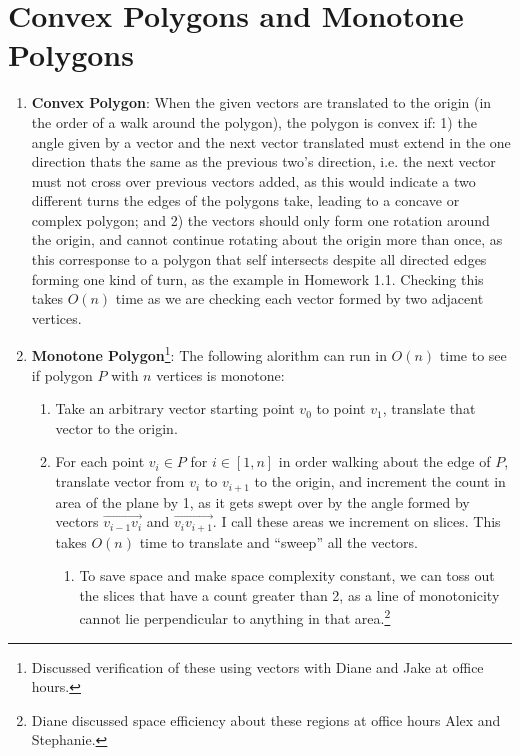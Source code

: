 \documentclass [12pt]{article}
\begin{document}
    \section{Convex Polygons and Monotone Polygons}
    \label{sec:three}

        \begin{enumerate}[label=\alph*.]
            \item \textbf{Convex Polygon}\footnotemark[2]: When the given vectors are translated to the origin (in the order of a walk around the polygon), the polygon is convex if: 1) the angle given by a vector and the next vector translated must extend in the one direction thats the same as the previous two's direction, i.e. the next vector must not cross over previous vectors added, as this would indicate a two different turns the edges of the polygons take, leading to a concave or complex polygon; and 2) the vectors should only form one rotation around the origin, and cannot continue rotating about the origin more than once, as this corresponse to a polygon that self intersects despite all directed edges forming one kind of turn, as the example in Homework 1.1. Checking this takes $O(n)$ time as we are checking each vector formed by two adjacent vertices.
            
            \item \textbf{Monotone Polygon}\footnote{Discussed verification of these using vectors with Diane and Jake at office hours.}: The following alorithm can run in $O(n)$ time to see if polygon $P$ with $n$ vertices is monotone: 
            
                \begin{enumerate}[label=\arabic*)]
                    \item Take an arbitrary vector starting point $v_0$ to point $v_{1}$, translate that vector to the origin.  
                    \item For each point $v_i \in P$ for $i \in [1,n]$ in order walking about the edge of $P$, translate vector from $v_{i}$ to $v_{i+1}$ to the origin, and increment the count in area of the plane by 1, as it gets swept over by the angle formed by vectors $\overrightarrow{v_{i-1} v_{i}}$ and $\overrightarrow{v_{i} v_{i+1}}$. I call these areas we increment on slices. This takes $O(n)$ time to translate and ``sweep'' all the vectors. 
                        \begin{enumerate}
                            \item To save space and make space complexity constant, we can toss out the slices that have a count greater than 2, as a line of monotonicity cannot lie perpendicular to anything in that area.\footnote{Diane discussed space efficiency about these regions at office hours Alex and Stephanie.} 
                        \end{enumerate}


\end{enumerate}
\end{enumerate}
\end{document}
